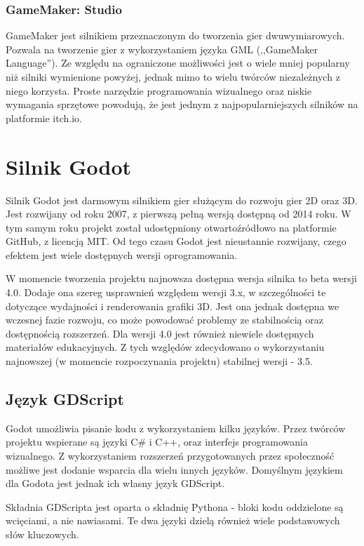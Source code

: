 \subsubsection{GameMaker: Studio}
GameMaker jest silnikiem przeznaczonym do tworzenia gier dwuwymiarowych. Pozwala na tworzenie gier z wykorzystaniem języka GML (,,GameMaker Language''). Ze względu na ograniczone możliwości jest o wiele mniej popularny niż silniki wymienione powyżej, jednak mimo to wielu twórców niezależnych z niego korzysta. Proste narzędzie programowania wizualnego oraz niskie wymagania sprzętowe powodują, że jest jednym z najpopularniejszych silników na platformie itch.io\cite{most_used_engines}.  

\section{Silnik Godot}
Silnik Godot\cite{godot_main} jest darmowym silnikiem gier służącym do rozwoju gier 2D oraz 3D. Jest rozwijany od roku 2007, z pierwszą pełną wersją dostępną od 2014 roku. W tym samym roku projekt został udostępniony otwartoźródłowo na platformie GitHub\cite{godot_github}, z licencją MIT. Od tego czasu Godot jest nieustannie rozwijany, czego efektem jest wiele dostępnych wersji oprogramowania. 

W momencie tworzenia projektu najnowsza dostępna wersja silnika to beta wersji 4.0. Dodaje ona szereg usprawnień względem wersji 3.x, w szczególności te dotyczące wydajności i renderowania grafiki 3D. Jest ona jednak dostępna we wczesnej fazie rozwoju, co może powodować problemy ze stabilnością oraz dostępnością rozszerzeń. Dla wersji 4.0 jest również niewiele dostępnych materiałów edukacyjnych. Z tych względów zdecydowano o wykorzystaniu najnowszej (w momencie rozpoczynania projektu) stabilnej wersji - 3.5\cite{godot_docs}. 

\subsection{Język GDScript}
Godot umożliwia pisanie kodu z wykorzystaniem kilku języków. Przez twórców projektu wspierane są języki C\# i C++, oraz interfejs programowania wizualnego. Z wykorzystaniem rozszerzeń przygotowanych przez społeczność możliwe jest dodanie wsparcia dla wielu innych języków. Domyślnym językiem dla Godota jest jednak ich własny język GDScript. 

Składnia GDScripta jest oparta o składnię Pythona - bloki kodu oddzielone są wcięciami, a nie nawiasami. Te dwa języki dzielą również wiele podstawowych słów kluczowych. 

